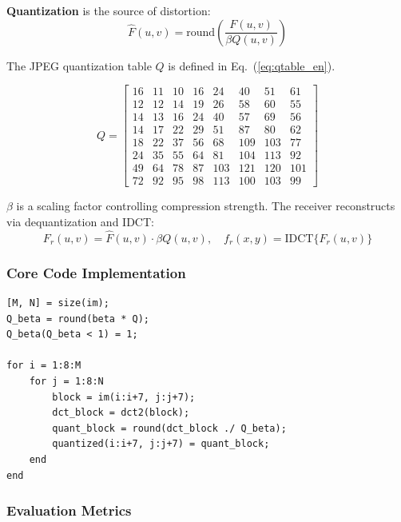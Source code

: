 \documentclass[12pt, a4paper]{article}
\begin{document}
\textbf{Quantization} is the source of distortion:
\begin{equation}
\hat{F}(u,v) = \text{round}\left(\frac{F(u,v)}{\beta Q(u,v)}\right)
\label{eq:quant_en}
\end{equation}

The JPEG quantization table $Q$ is defined in Eq.~(\ref{eq:qtable_en}).

\begin{equation}
Q = \begin{bmatrix}
16 & 11 & 10 & 16 & 24 & 40 & 51 & 61\\
12 & 12 & 14 & 19 & 26 & 58 & 60 & 55\\
14 & 13 & 16 & 24 & 40 & 57 & 69 & 56\\
14 & 17 & 22 & 29 & 51 & 87 & 80 & 62\\
18 & 22 & 37 & 56 & 68 & 109 & 103 & 77\\
24 & 35 & 55 & 64 & 81 & 104 & 113 & 92\\
49 & 64 & 78 & 87 & 103 & 121 & 120 & 101\\
72 & 92 & 95 & 98 & 113 & 100 & 103 & 99
\end{bmatrix}
\label{eq:qtable_en}
\end{equation}

$\beta$ is a scaling factor controlling compression strength. The receiver reconstructs via dequantization and IDCT:
\begin{equation}
F_r(u,v) = \hat{F}(u,v) \cdot \beta Q(u,v), \quad f_r(x,y) = \text{IDCT}\{F_r(u,v)\}
\label{eq:recon_en}
\end{equation}

\subsubsection{Core Code Implementation}

\begin{lstlisting}[caption=DCT block quantization core]
[M, N] = size(im);
Q_beta = round(beta * Q);
Q_beta(Q_beta < 1) = 1;

for i = 1:8:M
    for j = 1:8:N
        block = im(i:i+7, j:j+7);
        dct_block = dct2(block);
        quant_block = round(dct_block ./ Q_beta);
        quantized(i:i+7, j:j+7) = quant_block;
    end
end
\end{lstlisting}

\subsubsection{Evaluation Metrics}
\end{document}
